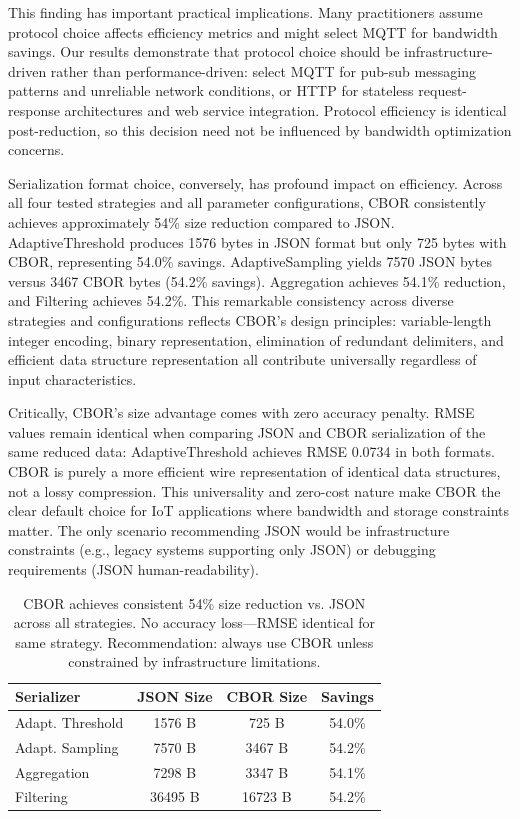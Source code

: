 \documentclass[10pt,twocolumn]{article}
\begin{document}
This finding has important practical implications. Many practitioners assume protocol choice affects efficiency metrics and might select MQTT for bandwidth savings. Our results demonstrate that protocol choice should be infrastructure-driven rather than performance-driven: select MQTT for pub-sub messaging patterns and unreliable network conditions, or HTTP for stateless request-response architectures and web service integration. Protocol efficiency is identical post-reduction, so this decision need not be influenced by bandwidth optimization concerns.

Serialization format choice, conversely, has profound impact on efficiency. Across all four tested strategies and all parameter configurations, CBOR consistently achieves approximately 54\% size reduction compared to JSON. AdaptiveThreshold produces 1576 bytes in JSON format but only 725 bytes with CBOR, representing 54.0\% savings. AdaptiveSampling yields 7570 JSON bytes versus 3467 CBOR bytes (54.2\% savings). Aggregation achieves 54.1\% reduction, and Filtering achieves 54.2\%. This remarkable consistency across diverse strategies and configurations reflects CBOR's design principles: variable-length integer encoding, binary representation, elimination of redundant delimiters, and efficient data structure representation all contribute universally regardless of input characteristics.

Critically, CBOR's size advantage comes with zero accuracy penalty. RMSE values remain identical when comparing JSON and CBOR serialization of the same reduced data: AdaptiveThreshold achieves RMSE 0.0734 in both formats. CBOR is purely a more efficient wire representation of identical data structures, not a lossy compression. This universality and zero-cost nature make CBOR the clear default choice for IoT applications where bandwidth and storage constraints matter. The only scenario recommending JSON would be infrastructure constraints (e.g., legacy systems supporting only JSON) or debugging requirements (JSON human-readability).

\begin{table}[H]
\centering
\small
\begin{tabular}{|l|c|c|c|}
\hline
\textbf{Serializer} & \textbf{JSON Size} & \textbf{CBOR Size} & \textbf{Savings} \\
\hline
Adapt. Threshold & 1576 B & 725 B & 54.0\% \\
\hline
Adapt. Sampling & 7570 B & 3467 B & 54.2\% \\
\hline
Aggregation & 7298 B & 3347 B & 54.1\% \\
\hline
Filtering & 36495 B & 16723 B & 54.2\% \\
\hline
\end{tabular}
\caption{CBOR achieves consistent 54\% size reduction vs. JSON across all strategies. No accuracy loss---RMSE identical for same strategy. Recommendation: always use CBOR unless constrained by infrastructure limitations.}
\label{tab:cbor}
\end{table}
\end{document}
